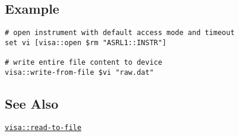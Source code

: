 \documentclass[12pt, a4paper]{report}
\newcommand{\COMMANDREF}[1]{{\tt \hyperref[#1]{#1}}}
\newcommand{\SEEALSO}{\subsection*{See Also}}
\newcommand{\EXAMPLE}{\subsection*{Example}}
\begin{document}
\EXAMPLE

\begin{verbatim} 
# open instrument with default access mode and timeout
set vi [visa::open $rm "ASRL1::INSTR"]

# write entire file content to device
visa::write-from-file $vi "raw.dat"
\end{verbatim} 

\SEEALSO

\COMMANDREF{visa::read-to-file}


%
\end{document}
